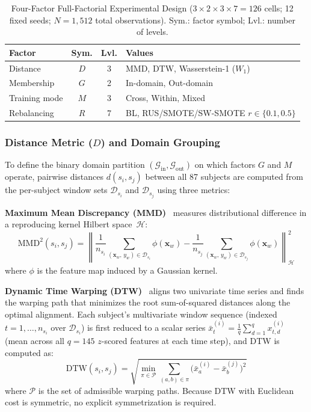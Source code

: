 \documentclass[lettersize,journal]{IEEEtran}
\begin{document}
\begin{table}[!t]
\caption{Four-Factor Full-Factorial Experimental Design ($3{\times}2{\times}3{\times}7 = 126$ cells; 12 fixed seeds; $N = 1{,}512$ total observations). Sym.: factor symbol; Lvl.: number of levels.\label{tab:factorial}}
\centering
\footnotesize
\begin{tabular}{|l|c|c|p{2.9cm}|}
\hline
Factor & Sym. & Lvl. & Values \\
\hline
Distance & $D$ & 3 & MMD, DTW, Wasserstein-1 ($W_1$) \\
\hline
Membership & $G$ & 2 & In-domain, Out-domain \\
\hline
Training mode & $M$ & 3 & Cross, Within, Mixed \\
\hline
Rebalancing & $R$ & 7 & BL, RUS/SMOTE/SW-SMOTE $r\!\in\!\{0.1,0.5\}$ \\
\hline
\end{tabular}
\end{table}

\subsubsection{Distance Metric ($D$) and Domain Grouping}\label{sec:grouping}
To define the binary domain partition $(\mathcal{G}_{\mathrm{in}}, \mathcal{G}_{\mathrm{out}})$ on which factors $G$ and $M$ operate, pairwise distances $d(s_i, s_j)$ between all 87 subjects are computed from the per-subject window sets $\mathcal{D}_{s_i}$ and $\mathcal{D}_{s_j}$ using three metrics:

\textbf{Maximum Mean Discrepancy (MMD)}~\cite{gretton2012} measures distributional difference in a reproducing kernel Hilbert space~$\mathcal{H}$:
\begin{equation}
\label{eq:mmd}
\mathrm{MMD}^2(s_i, s_j) = \left\| \frac{1}{n_{s_i}} \sum_{(\mathbf{x}_w,\,y_w) \in \mathcal{D}_{s_i}} \!\!\phi(\mathbf{x}_w) - \frac{1}{n_{s_j}} \sum_{(\mathbf{x}_w,\,y_w) \in \mathcal{D}_{s_j}} \!\!\phi(\mathbf{x}_w) \right\|_{\mathcal{H}}^2
\end{equation}
where $\phi$ is the feature map induced by a Gaussian kernel.

\textbf{Dynamic Time Warping (DTW)}~\cite{berndt1994} aligns two univariate time series and finds the warping path that minimizes the root sum-of-squared distances along the optimal alignment.
Each subject's multivariate window sequence (indexed $t = 1, \ldots, n_{s_i}$ over $\mathcal{D}_{s_i}$) is first reduced to a scalar series $\bar{x}_t^{(i)} = \frac{1}{q}\sum_{d=1}^{q} x_{t,d}^{(i)}$ (mean across all $q = 145$ $z$-scored features at each time step), and DTW is computed as:
\begin{equation}
\label{eq:dtw}
\mathrm{DTW}(s_i, s_j) = \sqrt{\min_{\pi \in \mathcal{P}} \sum_{(a,b) \in \pi} \bigl(\bar{x}_a^{(i)} - \bar{x}_b^{(j)}\bigr)^2}
\end{equation}
where $\mathcal{P}$ is the set of admissible warping paths.
Because DTW with Euclidean cost is symmetric, no explicit symmetrization is required.
\end{document}
